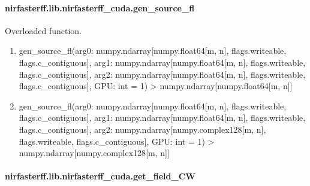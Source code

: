 \documentclass[letterpaper,10pt,english]{sphinxmanual}
\begin{document}
\sphinxstepscope


\paragraph{nirfasterff.lib.nirfasterff\_cuda.gen\_source\_fl}
\label{\detokenize{_autosummary/nirfasterff.lib.nirfasterff_cuda.gen_source_fl:nirfasterff-lib-nirfasterff-cuda-gen-source-fl}}\label{\detokenize{_autosummary/nirfasterff.lib.nirfasterff_cuda.gen_source_fl::doc}}

\begin{fulllineitems}
\label{\detokenize{_autosummary/nirfasterff.lib.nirfasterff_cuda.gen_source_fl:nirfasterff.lib.nirfasterff_cuda.gen_source_fl}}
\pysigstartsignatures
{}
\pysigstopsignatures
\sphinxAtStartPar
Overloaded function.
\begin{enumerate}
%
\item {} 
\sphinxAtStartPar
gen\_source\_fl(arg0: numpy.ndarray{[}numpy.float64{[}m, n{]}, flags.writeable, flags.c\_contiguous{]}, arg1: numpy.ndarray{[}numpy.float64{[}m, n{]}, flags.writeable, flags.c\_contiguous{]}, arg2: numpy.ndarray{[}numpy.float64{[}m, n{]}, flags.writeable, flags.c\_contiguous{]}, GPU: int = \sphinxhyphen{}1) \sphinxhyphen{}\textgreater{} numpy.ndarray{[}numpy.float64{[}m, n{]}{]}

\item {} 
\sphinxAtStartPar
gen\_source\_fl(arg0: numpy.ndarray{[}numpy.float64{[}m, n{]}, flags.writeable, flags.c\_contiguous{]}, arg1: numpy.ndarray{[}numpy.float64{[}m, n{]}, flags.writeable, flags.c\_contiguous{]}, arg2: numpy.ndarray{[}numpy.complex128{[}m, n{]}, flags.writeable, flags.c\_contiguous{]}, GPU: int = \sphinxhyphen{}1) \sphinxhyphen{}\textgreater{} numpy.ndarray{[}numpy.complex128{[}m, n{]}{]}

\end{enumerate}

\end{fulllineitems}


\sphinxstepscope


\paragraph{nirfasterff.lib.nirfasterff\_cuda.get\_field\_CW}
\label{\detokenize{_autosummary/nirfasterff.lib.nirfasterff_cuda.get_field_CW:nirfasterff-lib-nirfasterff-cuda-get-field-cw}}\label{\detokenize{_autosummary/nirfasterff.lib.nirfasterff_cuda.get_field_CW::doc}}
\end{document}
